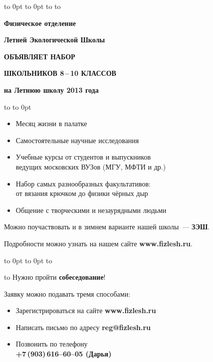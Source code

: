 \documentclass[a4paper,12pt]{article}
\begin{document}
\vbox to 0pt{%
\vbox to 0pt{\vskip9pt
\hbox to \vss}%
}%
\vskip28pt
\hbox to 
\vskip 34pt
\centerline{\Large\textbf{Физическое отделение}}
\vskip 10pt
\centerline{\Large\textbf{Летней Экологической Школы}}
\vskip15pt
\centerline{\huge\textsf{\textbf{ОБЪЯВЛЯЕТ НАБОР}}}
\vskip 15pt
\centerline{\huge\textsf{\textbf{ШКОЛЬНИКОВ 8\,--\,10 КЛАССОВ}}}
\vskip 10pt
\centerline{\Large\textbf{на Летнюю школу {\Huge 2013} года}}
\vskip24pt
\hbox to 
\vskip-24pt\hbox to 0pt{}

{\Large%
\begin{itemize}
\setlength{\itemsep}{-4pt}
\setlength{\parindent}{0pt}
\item Месяц жизни в палатке
\item Самостоятельные научные исследования
\item Учебные курсы от студентов и выпускников\\ведущих московских ВУЗов (МГУ, МФТИ и др.)
\item Набор самых разнообразных факультативов:\\от вязания крючком до физики чёрных дыр
\item Общение с творческими и незаурядными людьми
\end{itemize}

Можно поучаствовать и в зимнем варианте нашей школы~--- \textbf{ЗЭШ}.

\vskip 12pt

Подробности можно узнать на нашем сайте \textbf{www.fizlesh.ru}.

\vbox to 0pt{%
\vbox to 0pt{%
\vskip21mm
\hbox to \vss}%
}%

\hbox to 
\vskip6pt
Нужно пройти \textbf{собеседование}!\par
Заявку можно подавать тремя способами:
\begin{itemize}
\setlength{\itemsep}{-4pt}
\item Зарегистрироваться на сайте \textbf{www.fizlesh.ru}
\item Написать письмо по адресу \textbf{reg@fizlesh.ru}
\item Позвонить по телефону\\
\textbf{+7\,(903)\,616--60--05 (Дарья)}
\end{itemize}
}%
\end{document}
